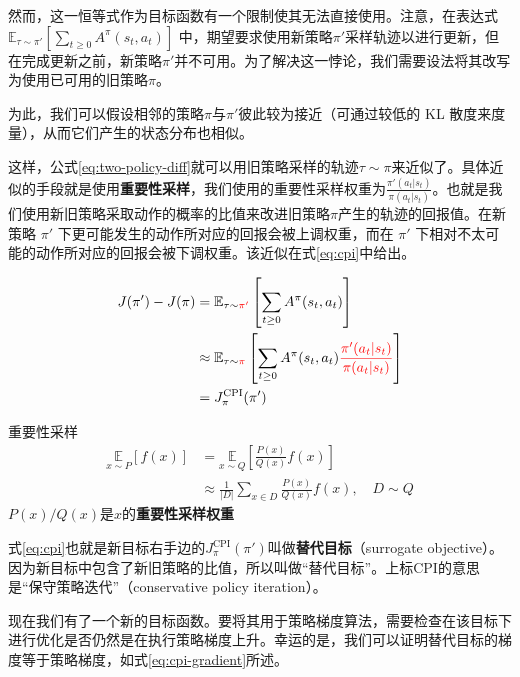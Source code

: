 \documentclass[lang=cn,newtx,10pt,scheme=chinese]{elegantbook}
\begin{document}
然而，这一恒等式作为目标函数有一个限制使其无法直接使用。注意，在表达式 $\mathbb{E}_{\tau\sim\pi'}\left[ \sum_{t\geq 0}A^\pi(s_t,a_t) \right]$ 中，期望要求使用新策略$\pi'$采样轨迹以进行更新，但在完成更新之前，新策略$\pi'$并不可用。为了解决这一悖论，我们需要设法将其改写为使用已可用的旧策略$\pi$。

为此，我们可以假设相邻的策略$\pi$与$\pi'$彼此较为接近（可通过较低的 KL 散度来度量），从而它们产生的状态分布也相似。

这样，公式\ref{eq:two-policy-diff}就可以用旧策略采样的轨迹$\tau\sim\pi$来近似了。具体近似的手段就是使用\textbf{重要性采样}，我们使用的重要性采样权重为$\frac{\pi'(a_t|s_t)}{\pi(a_t|s_t)}$。也就是我们使用新旧策略采取动作的概率的比值来改进旧策略$\pi$产生的轨迹的回报值。在新策略 $\pi'$ 下更可能发生的动作所对应的回报会被上调权重，而在 $\pi'$ 下相对不太可能的动作所对应的回报会被下调权重。该近似在式\ref{eq:cpi}中给出。

\begin{equation}\label{eq:cpi}
\begin{aligned}
J(\pi')-J(\pi) &= \mathbb{E}_{\tau\sim{\color{red}\pi'}}\left[ \sum_{t\geq 0}A^\pi(s_t,a_t) \right] \\
& \approx \mathbb{E}_{\tau\sim{\color{red}\pi}}\left[ \sum_{t\geq 0}A^\pi(s_t,a_t){\color{red}\frac{\pi'(a_t|s_t)}{\pi(a_t|s_t)}} \right] \\
&= J^{\text{CPI}}_\pi(\pi')
\end{aligned}
\end{equation}

\begin{marker}
重要性采样
\begin{equation*}
\begin{aligned}
\underset{x\sim P}{\mathbb{E}}[f(x)] &= \underset{x\sim Q}{\mathbb{E}}\left[ \frac{P(x)}{Q(x)}f(x) \right] \\
& \approx \frac{1}{|D|}\sum_{x\in D}\frac{P(x)}{Q(x)}f(x),\quad D\sim Q
\end{aligned}
\end{equation*}
$P(x)/Q(x)$是$x$的\textbf{重要性采样权重}
\end{marker}

式\ref{eq:cpi}也就是新目标右手边的$J^{\text{CPI}}_\pi(\pi')$叫做\textbf{替代目标}（surrogate objective）。因为新目标中包含了新旧策略的比值，所以叫做``替代目标''。上标CPI的意思是``保守策略迭代''（conservative policy iteration）。

现在我们有了一个新的目标函数。要将其用于策略梯度算法，需要检查在该目标下进行优化是否仍然是在执行策略梯度上升。幸运的是，我们可以证明替代目标的梯度等于策略梯度，如式\ref{eq:cpi-gradient}所述。
\end{document}
